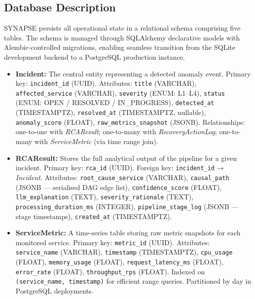 \subsection{Database Description}

\hspace*{0.3in} SYNAPSE persists all operational state in a relational schema comprising five tables. The schema is managed through SQLAlchemy declarative models with Alembic-controlled migrations, enabling seamless transition from the SQLite development backend to a PostgreSQL production instance.

\begin{itemize}

    \item \textbf{Incident:} The central entity representing a detected anomaly event. Primary key: \texttt{incident\_id} (UUID). Attributes: \texttt{title} (VARCHAR), \texttt{affected\_service} (VARCHAR), \texttt{severity} (ENUM: L1–L4), \texttt{status} (ENUM: OPEN / RESOLVED / IN\_PROGRESS), \texttt{detected\_at} (TIMESTAMPTZ), \texttt{resolved\_at} (TIMESTAMPTZ, nullable), \texttt{anomaly\_score} (FLOAT), \texttt{raw\_metrics\_snapshot} (JSONB). Relationships: one-to-one with \textit{RCAResult}; one-to-many with \textit{RecoveryActionLog}; one-to-many with \textit{ServiceMetric} (via time range join).

    \item \textbf{RCAResult:} Stores the full analytical output of the pipeline for a given incident. Primary key: \texttt{rca\_id} (UUID). Foreign key: \texttt{incident\_id} → \textit{Incident}. Attributes: \texttt{root\_cause\_service} (VARCHAR), \texttt{causal\_path} (JSONB — serialised DAG edge list), \texttt{confidence\_score} (FLOAT), \texttt{llm\_explanation} (TEXT), \texttt{severity\_rationale} (TEXT), \texttt{processing\_duration\_ms} (INTEGER), \texttt{pipeline\_stage\_log} (JSONB — stage timestamps), \texttt{created\_at} (TIMESTAMPTZ).

    \item \textbf{ServiceMetric:} A time-series table storing raw metric snapshots for each monitored service. Primary key: \texttt{metric\_id} (UUID). Attributes: \texttt{service\_name} (VARCHAR), \texttt{timestamp} (TIMESTAMPTZ), \texttt{cpu\_usage} (FLOAT), \texttt{memory\_usage} (FLOAT), \texttt{request\_latency\_ms} (FLOAT), \texttt{error\_rate} (FLOAT), \texttt{throughput\_rps} (FLOAT). Indexed on \texttt{(service\_name, timestamp)} for efficient range queries. Partitioned by day in PostgreSQL deployments.


\end{itemize}
